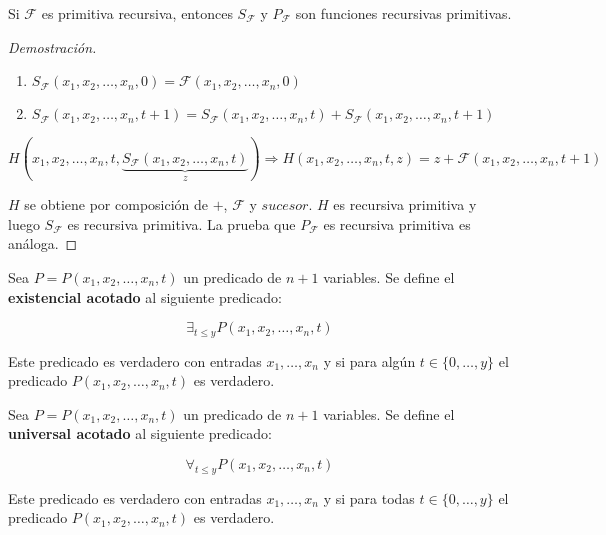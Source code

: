 \begin{proposition}
Si $\mathcal{F}$ es primitiva recursiva, entonces $S_{\mathcal{F}}$ y $P_{\mathcal{F}}$ son funciones recursivas primitivas.
 
\begin{proof}[Demostraci\'on]
\hfill
\begin{enumerate}
	\item $S_{\mathcal{F}}(x_1, x_2, \ldots, x_n, 0) = \mathcal{F}(x_1, x_2, \ldots, x_n, 0)$
	\item $S_{\mathcal{F}}(x_1, x_2, \ldots, x_n, t + 1) = S_{\mathcal{F}}(x_1, x_2, \ldots, x_n, t) + S_{\mathcal{F}}(x_1, x_2, \ldots, x_n, t + 1)$
\end{enumerate}
 
$H(x_1, x_2, \ldots, x_n, t, \underbrace{S_{\mathcal{F}}(x_1, x_2, \ldots, x_n, t)}_{z}) \Rightarrow H(x_1, x_2, \ldots, x_n, t, z) = z + \mathcal{F}(x_1, x_2, \ldots, x_n, t + 1)$
 
$H$ se obtiene por composici\'on de $+$, $\mathcal{F}$ y $sucesor$. $H$ es recursiva primitiva y luego $S_{\mathcal{F}}$ es recursiva primitiva. La prueba que $P_{\mathcal{F}}$ es recursiva primitiva es an\'aloga.
\end{proof}
 
\end{proposition}
 
\begin{definition}
Sea $P = P(x_1, x_2, \ldots, x_n, t)$ un predicado de $n + 1$ variables. Se define el \textbf{existencial acotado} al siguiente predicado:
 
\[
\exists_{t \leq y} P(x_1, x_2, \ldots, x_n, t)
\]
 
Este predicado es verdadero con entradas $x_1, \ldots, x_n$ y si para alg\'un $t \in \{0, \ldots, y \}$ el predicado $P(x_1, x_2, \ldots, x_n, t)$ es verdadero.
 
\end{definition}
 
\begin{definition}
Sea $P = P(x_1, x_2, \ldots, x_n, t)$ un predicado de $n + 1$ variables. Se define el \textbf{universal acotado} al siguiente predicado:
 
\[
\forall_{t \leq y} P(x_1, x_2, \ldots, x_n, t)
\]
 
Este predicado es verdadero con entradas $x_1, \ldots, x_n$ y si para todas $t \in \{0, \ldots, y \}$ el predicado $P(x_1, x_2, \ldots, x_n, t)$ es verdadero.
 
\end{definition}
 

